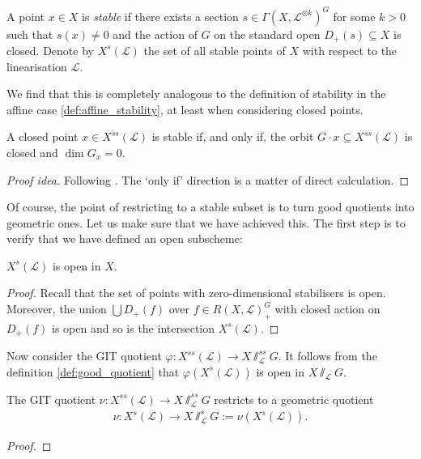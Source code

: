 \documentclass[12pt]{ociamthesis}  %
\begin{document}
\begin{definition}
  A point $x\in X$ is \emph{stable} if there exists a section
  $s\in\Gamma(X,\mathscr L^{\otimes k})^G$ for some $k>0$ such that $s(x)\neq 0$
  and the action of $G$ on the standard open $D_+(s)\subseteq X$ is closed.
  Denote by $X^s(\mathscr L)$ the set of all stable points of $X$ with respect
  to the linearisation $\mathscr L$.
\end{definition}

We find that this is completely analogous to the definition
of stability in the affine case \ref{def:affine_stability}, at
least when considering closed points.

\begin{lemma}
  A closed point $x\in X^{ss}(\mathscr L)$ is stable if, and only if, the orbit
  $G\cdot x\subseteq X^{ss}(\mathscr L)$ is closed and $\dim G_x = 0$.
  \begin{proof}[Proof idea]
    Following \cite[Lemma 5.9]{hoskins2016}.
    The `only if' direction is a matter of direct calculation.
    \missingproof
  \end{proof}
\end{lemma}

Of course, the point of restricting to a stable subset is to turn
good quotients into geometric ones. Let us make sure that we have
achieved this. The first step is to verify that we have defined
an open subscheme:

\begin{lemma}
  $X^s(\mathscr L)$ is open in $X$.
  \begin{proof}
    Recall that the set of points with zero-dimensional stabilisers is open.
    Moreover, the union $\bigcup D_+(f)$ over $f\in R(X,\mathscr L)_+^G$
    with closed action on $D_+(f)$ is open and so is the intersection
    $X^s(\mathscr L)$.
  \end{proof}
\end{lemma}

Now consider the GIT quotient $\varphi : X^{ss}(\mathscr L)\to X\sslash^{ss}_{\mathscr L} G$.
It follows from the definition \ref{def:good_quotient} that
$\varphi(X^s(\mathscr L))$ is open in $X\sslash_{\mathscr L} G$.

\begin{theorem}
  The GIT quotient $\nu : X^{ss}({\mathscr L}) \to X\sslash^{ss}_{\mathscr L} G$
  restricts to a geometric quotient
  \begin{align*}
    \nu : X^s({\mathscr L}) \to X\sslash^s_{\mathscr L} G := \nu(X^s({\mathscr L})).
  \end{align*}
  \begin{proof}
    \missingproof
  \end{proof}
\end{theorem}
\end{document}
